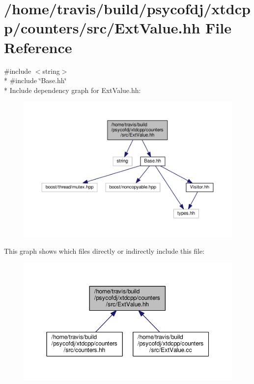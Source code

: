 \hypertarget{ExtValue_8hh}{\section{/home/travis/build/psycofdj/xtdcpp/counters/src/\-Ext\-Value.hh File Reference}
\label{ExtValue_8hh}
}
{\ttfamily \#include $<$string$>$}\\*
{\ttfamily \#include \char`\"{}Base.\-hh\char`\"{}}\\*
Include dependency graph for Ext\-Value.\-hh\-:
\nopagebreak
\begin{figure}[H]
\begin{center}
\leavevmode
\includegraphics[width=350pt]{ExtValue_8hh__incl}
\end{center}
\end{figure}
This graph shows which files directly or indirectly include this file\-:
\nopagebreak
\begin{figure}[H]
\begin{center}
\leavevmode
\includegraphics[width=350pt]{ExtValue_8hh__dep__incl}
\end{center}
\end{figure}
